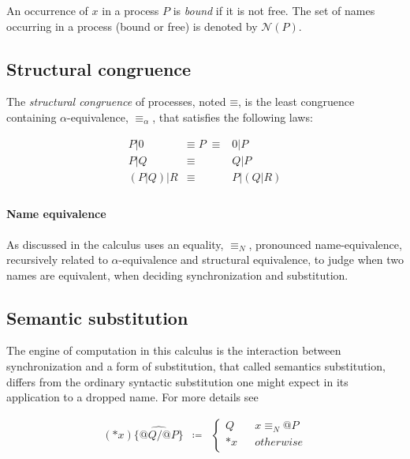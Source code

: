 \documentclass[]{amsart}
\makeatletter
\newcommand{\id}[1]{\texttt{#1}}
\newcommand{\pzero}{\mathbin{0}}
\newcommand{\juxtap}{\mathbin{\id{|}}}
\newcommand{\scong}{\mathbin{\equiv}}
\newcommand{\nameeq}{\mathbin{\equiv_N}}
\newcommand{\alphaeq}{\mathbin{\equiv_{\alpha}}}
\newcommand{\names}[1]{\mathbin{\mathcal{N}(#1)}}
\newcommand{\quotep}[1]{@#1}
\newcommand{\dropn}[1]{*#1}
\newcommand{\substp}[2]{\id{\{} \quotep{#1} / \quotep{#2} \id{\}}}
\newcommand{\psubstp}[2]{\widehat{\substp{#1}{#2}}}
\newcommand{\defneqls}{\coloneqq}
\theoremstyle{definition}
\theoremstyle{remark}
\numberwithin{equation}{subsection}
\makeatother
\begin{document}
An occurrence of $x$ in a process $P$ is \textit{bound} if it is not
free. The set of names occurring in a process (bound or free) is
denoted by $\names{P}$.

\subsection{Structural congruence}

The {\em structural congruence} of processes, noted $\scong$, is the
least congruence containing $\alpha$-equivalence, $\alphaeq$, that
satisfies the following laws:

\begin{eqnarray*}
	{P} \juxtap \pzero	
		&  \scong \; {P} \; \scong & 
			\pzero \juxtap {P} \\
	{P} \juxtap {Q}	
		& \scong & 
			{Q} \juxtap {P} \\
	({P} \juxtap {Q}) \juxtap {R}
		& \scong & 
			{P} \juxtap ({Q} \juxtap {R}) \\
\end{eqnarray*}

\paragraph{Name equivalence} As discussed in
\cite{DBLP:conf/tgc/MeredithR05} the calculus uses an equality,
$\nameeq$, pronounced name-equivalence, recursively related to
$\alpha$-equivalence and structural equivalence, to judge when two
names are equivalent, when deciding synchronization and substitution.

\subsection{Semantic substitution}

The engine of computation in this calculus is the interaction between
synchronization and a form of substitution, that called semantics
substitution, differs from the ordinary syntactic substitution one
might expect in its application to a dropped name. For more details
see \cite{DBLP:journals/entcs/MeredithR05}

\begin{eqnarray*}
(\dropn{x})  \psubstp{Q}{P}       
		& \defneqls & 
		\left\{ 
			\begin{array}{ccc} 
				Q & & x \nameeq \quotep{P} \\
                              	\dropn{x} & & otherwise \\
			\end{array}
		\right.
\end{eqnarray*}
\end{document}
